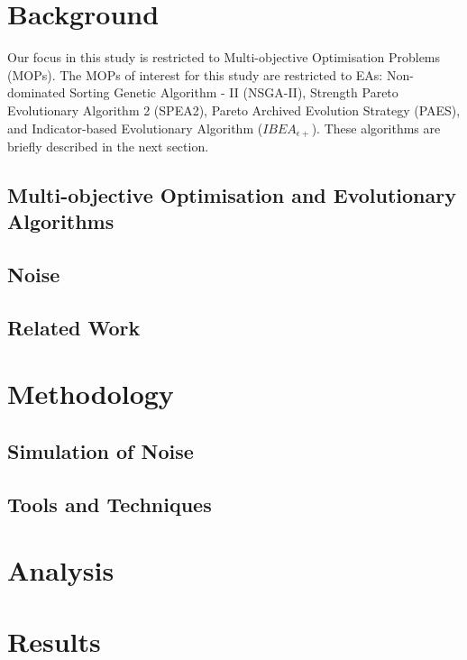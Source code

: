 \documentclass[conference,a4paper]{IEEEtran}
\begin{document}
\section{Background}\label{sec: two}
Our focus in this study is restricted to Multi-objective Optimisation Problems (MOPs). 
The MOPs of interest for this study are restricted to EAs: Non-dominated Sorting Genetic Algorithm - II (NSGA-II), Strength Pareto Evolutionary Algorithm 2 (SPEA2), Pareto Archived Evolution Strategy (PAES), and Indicator-based Evolutionary Algorithm ($IBEA_{\epsilon+}$). These algorithms are briefly described in the next section.

\subsection{Multi-objective Optimisation and Evolutionary Algorithms}\label{sec:twoA}

\subsection{Noise}\label{sec:twoB}

\subsection{Related Work}\label{sec: twoC}

\section{Methodology}\label{sec: three}

\subsection{Simulation of Noise}\label{sec: threeA}

\subsection{Tools and Techniques}\label{sec: threeB}

\section{Analysis}\label{sec: four}

\section{Results}\label{sec: five}
\end{document}
